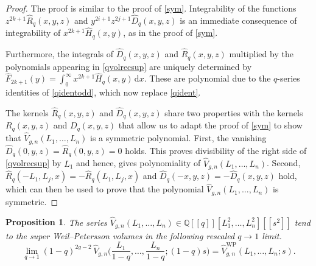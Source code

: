 \documentclass[a4paper]{article}
\theoremstyle{plain}
\newtheorem{proposition}[theorem]{Proposition}
\theoremstyle{definition}
\newcommand{\dd}{\mathrm{d}}
\newcommand{\bq}{\mathbb{Q}}
\begin{document}
\begin{proof}
The proof is similar to the proof of \cref{sym}. Integrability of the functions $z^{2k+1}\widehat{R}_q(x,y,z)$ and $y^{2i+1}z^{2j+1}\widehat{D}_q(x,y,z)$ is an immediate consequence of integrability of $x^{2k+1}\widehat{H}_q(x,y)$, as in the proof of \cref{sym}. 


Furthermore, the integrals of $\widehat{D}_q(x,y,z)$ and $\widehat{R}_q(x,y,z)$ multiplied by the polynomials appearing in \cref{qvolrecsup} are uniquely determined by $\widehat{F}_{2k+1}(y)=\int_0^\infty \! x^{2k+1}\widehat{H}_q(x,y) \, \dd x$. These are polynomial due to the $q$-series identities of \cref{qidentodd}, which now replace \cref{qident}.

 
The kernels $\widehat{R}_q(x,y,z)$ and $\widehat{D}_q(x,y,z)$ share two properties with the kernels $R_q(x,y,z)$ and $D_q(x,y,z)$ that allow us to adapt the proof of \cref{sym} to show that $\widehat{V}_{g,n}(L_1, \ldots, L_n)$ is a symmetric polynomial. First, the vanishing $\widehat{D}_q(0,y,z)=\widehat{R}_q(0,y,z)=0$ holds. This proves divisibility of the right side of \cref{qvolrecsup} by $L_1$ and hence, gives polynomiality of $\widehat{V}_{g,n}(L_1, \ldots, L_n)$. Second, $\widehat{R}_q(-L_1,L_j,x)=-\widehat{R}_q(L_1,L_j,x)$ and $\widehat{D}_q(-x,y,z)=-\widehat{D}_q(x,y,z)$ hold, which can then be used to prove that the polynomial $\widehat{V}_{g,n}(L_1, \ldots, L_n)$ is symmetric.
\end{proof}


\begin{proposition} \label{limitsup}
The series $\widehat{V}_{g,n}(L_1, \ldots, L_n) \in\bq[[q]][L_1^2, \ldots, L_n^2][[s^2]]$ tend to the super Weil--Petersson volumes in the following rescaled $q \to 1$ limit.
\[
\lim_{q\to 1}(1-q)^{2g-2} \, \widehat{V}_{g,n}\Big(\frac{L_1}{1-q}, \ldots, \frac{L_n}{1-q}; (1-q)s \Big)=\widehat{V}^{\mathrm{WP}}_{g,n}(L_1, \ldots, L_n; s).
\]
\end{proposition}
\end{document}
